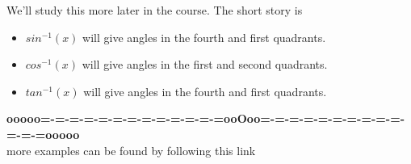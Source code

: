 \documentclass{ximera}
\begin{document}
We'll study this more later in the course.  The short story is




\begin{itemize}
\item $sin^{-1}(x)$ will give angles in the fourth and first quadrants.
\item $cos^{-1}(x)$ will give angles in the first and second quadrants.
\item $tan^{-1}(x)$ will give angles in the fourth and first quadrants.
\end{itemize}






\begin{center}
\textbf{\textcolor{green!50!black}{ooooo=-=-=-=-=-=-=-=-=-=-=-=-=ooOoo=-=-=-=-=-=-=-=-=-=-=-=-=ooooo}} \\

more examples can be found by following this link\\ 

\end{center}
\end{document}
